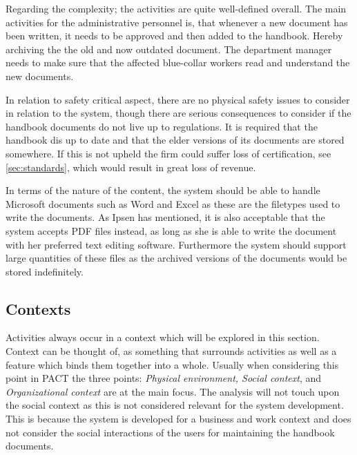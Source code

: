 Regarding the complexity; the activities are quite well-defined overall.
The main activities for the administrative personnel is, that whenever a new document has been written, it needs to be approved and then added to the handbook.
Hereby archiving the the old and now outdated document.
The department manager needs to make sure that the affected blue-collar workers read and understand the new documents.


In relation to safety critical aspect, there are no physical safety issues to consider in relation to the system, though there are serious consequences to consider if the handbook documents do not live up to regulations.
It is required that the handbook dis up to date and that the elder versions of its documents are stored somewhere.
If this is not upheld the firm could suffer loss of certification, see \cref{sec:standards}, which would result in great loss of revenue.

In terms of the nature of the content, the system should be able to handle Microsoft documents such as Word and Excel as these are the filetypes used to write the documents.
As Ipsen has mentioned, it is also acceptable that the system accepts PDF files instead, as long as she is able to write the document with her preferred text editing software.
Furthermore the system should support large quantities of these files as the archived versions of the documents would be stored indefinitely.

\subsection{Contexts}
Activities always occur in a context which will be explored in this section.
Context can be thought of, as something that surrounds activities as well as a feature which binds them together into a whole.
Usually when considering this point in PACT the three points: \textit{Physical environment, Social context}, and \textit{Organizational context} are at the main focus.
The analysis will not touch upon the social context as this is not considered relevant for the system development.
This is because the system is developed for a business and work context and does not consider the social interactions of the users for maintaining the handbook documents.

